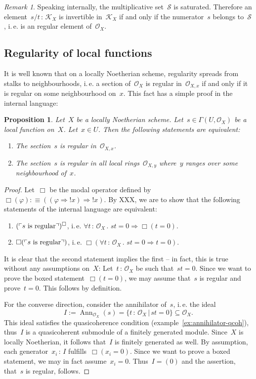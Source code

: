 \documentclass[10pt]{amsart}
\makeatletter
\theoremstyle{definition}
\theoremstyle{plain}
\newtheorem{prop}[defn]{Proposition}
\theoremstyle{remark}
\newtheorem{rem}[defn]{Remark}
\renewcommand{\O}{\mathcal{O}}
\newcommand{\K}{\mathcal{K}}
\renewcommand{\S}{\mathcal{S}}
\DeclareMathOperator{\Ann}{Ann}
\newcommand{\?}{\,{:}\,}
\renewcommand{\_}{\mathpunct{.}\,}
\newcommand{\speak}[1]{\ulcorner\text{\textnormal{#1}}\urcorner}
\newcommand{\ie}{i.\,e.\@\xspace}
\makeatother
\begin{document}
\begin{rem}Speaking internally, the multiplicative set~$\S$ is saturated.
Therefore an element~$s/t \? \K_X$ is invertible in~$\K_X$ if and only if the
numerator~$s$ belongs to~$\S$, \ie is an regular element of~$\O_X$.\end{rem}


\subsection{Regularity of local functions}
It is well known that on a locally Noetherian scheme, regularity spreads from
stalks to neighbourhoods, \ie a section of~$\O_X$ is regular
in~$\O_{X,x}$ if and only if it is regular on some neighbourhood on~$x$.
This fact has a simple proof in the internal language:
\begin{prop}\label{prop:regularity-spreading}
Let~$X$ be a locally Noetherian scheme. Let~$s \in \Gamma(U,\O_X)$
be a local function on~$X$. Let~$x \in U$. Then the following statements are
equivalent:
\begin{enumerate}
\item The section~$s$ is regular in~$\O_{X,x}$.
\item The section~$s$ is regular in all local rings~$\O_{X,y}$ where~$y$ ranges
over some neighbourhood of~$x$.
\end{enumerate}
\end{prop}
\begin{proof}
Let~$\Box$ be the modal operator defined by~$\Box(\varphi) :\equiv ((\varphi
\Rightarrow {!x}) \Rightarrow {!x})$. By XXX, we are to show that the following
statements of the internal language
are equivalent:
\begin{enumerate}
\item $(\speak{$s$ is regular})^\Box$, \ie
$\forall t\?\O_X\_ st = 0 \Rightarrow \Box(t = 0)$.
\item $\Box(\speak{$s$ is regular})$, \ie
$\Box(\forall t\?\O_X\_ st = 0 \Rightarrow t = 0)$.
\end{enumerate}
It is clear that the second statement implies the first -- in fact, this is true
without any assumptions on~$X$: Let~$t\?\O_X$ be such that~$st = 0$. Since we want to
prove the boxed statement~$\Box(t=0)$, we may assume that~$s$ is regular and
prove~$t = 0$. This follows by definition.

For the converse direction, consider the annihilator of~$s$, \ie the ideal
\[ I := \Ann_{\O_X}(s) = \{ t\?\O_X \,|\, st = 0 \} \subseteq \O_X. \]
This ideal satisfies the quasicoherence condition (example~\ref{ex:annihilator-qcoh}),
thus~$I$ is a quasicoherent submodule of a finitely generated module. Since~$X$ is
locally Noetherian, it follows that~$I$ is finitely generated as well. By
assumption, each generator~$x_i \? I$ fulfills~$\Box(x_i = 0)$. Since we want
to prove a boxed statement, we may in fact assume~$x_i = 0$. Thus~$I = (0)$ and
the assertion, that~$s$ is regular, follows.
\end{proof}
\end{document}
